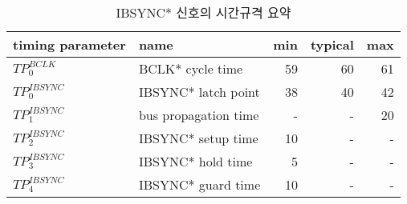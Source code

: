 %
%
\begin{table}[htbp]
\caption{IBSYNC* 신호의 시간규격 요약}\label{table:ibsync-time}
   \begin{center}
   \begin{tabular}{|l|l|r|r|r|} \hline
	timing parameter & name & min & typical & max \\ \hline \hline
	$TP^{BCLK}_0$   & BCLK* cycle time & 59 & 60 & 61 \\ \hline
	$TP^{IBSYNC}_0$  & IBSYNC* latch point & 38 & 40 & 42 \\ \hline
	$TP^{IBSYNC}_1$  & bus propagation time & - & - & 20 \\ \hline
	$TP^{IBSYNC}_2$  & IBSYNC* setup time & 10 & - & - \\ \hline
	$TP^{IBSYNC}_3$  & IBSYNC* hold time & 5 & - & - \\ \hline
	$TP^{IBSYNC}_4$  & IBSYNC* guard time & 10 & - & - \\ \hline
   \end{tabular}
   \end{center}
\end{table}
%
%
